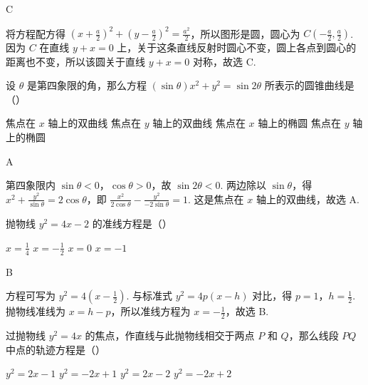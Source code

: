 \documentclass[UTF8,a4paper,oneside,11pt]{ctexbook}
\begin{document}
\begin{answer}
C
\end{answer}

\begin{solution}
将方程配方得 \(\left(x+\frac a2\right)^2+\left(y-\frac a2\right)^2=\frac{a^2}{2}\)，所以图形是圆，圆心为 \(C\left(-\frac a2,\frac a2\right)\). 因为 \(C\) 在直线 \(y+x=0\) 上，关于这条直线反射时圆心不变，圆上各点到圆心的距离也不变，所以该圆关于直线 \(y+x=0\) 对称，故选 C.
\end{solution}

\begin{problem}
设 \(\theta\) 是第四象限的角，那么方程 \((\sin \theta)x^2 + y^2 = \sin 2\theta\) 所表示的圆锥曲线是（\quad）

\choices
    {焦点在 \(x\) 轴上的双曲线}
    {焦点在 \(y\) 轴上的双曲线}
    {焦点在 \(x\) 轴上的椭圆}
    {焦点在 \(y\) 轴上的椭圆}
\end{problem}

\begin{answer}
A
\end{answer}

\begin{solution}
第四象限内 \(\sin\theta<0\)，\(\cos\theta>0\)，故 \(\sin2\theta<0\). 两边除以 \(\sin\theta\)，得 \(x^2+\frac{y^2}{\sin\theta}=2\cos\theta\)，即 \(\frac{x^2}{2\cos\theta}-\frac{y^2}{-2\sin\theta}=1\). 这是焦点在 \(x\) 轴上的双曲线，故选 A.
\end{solution}

\begin{problem}
抛物线 \(y^2 = 4x - 2\) 的准线方程是（\quad）

\choices
    {\(x = \frac{1}{4}\)}
    {\(x = -\frac{1}{2}\)}
    {\(x = 0\)}
    {\(x = -1\)}
\end{problem}

\begin{answer}
B
\end{answer}

\begin{solution}
方程可写为 \(y^2=4\left(x-\frac12\right)\). 与标准式 \(y^2=4p(x-h)\) 对比，得 \(p=1\)，\(h=\frac12\). 抛物线准线为 \(x=h-p\)，所以准线方程为 \(x=-\frac12\)，故选 B.
\end{solution}

\begin{problem}
过抛物线 \(y^2 = 4x\) 的焦点，作直线与此抛物线相交于两点 \(P\) 和 \(Q\)，那么线段 \(PQ\) 中点的轨迹方程是（\quad）

\choices
    {\(y^2 = 2x - 1\)}
    {\(y^2 = -2x + 1\)}
    {\(y^2 = 2x - 2\)}
    {\(y^2 = -2x + 2\)}
\end{problem}
\end{document}
